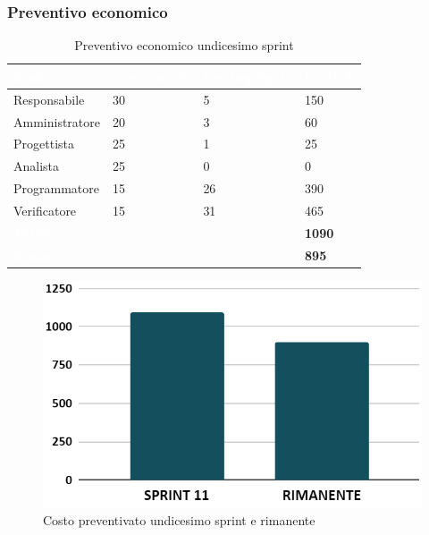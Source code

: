 \newpage

\subsubsection{Preventivo economico}

{
\setlength{\tabcolsep}{10pt}
\renewcommand{\arraystretch}{1.5}
\begin{table}[h]
    \centering
    \begin{tabularx}{\textwidth}{| l | l | l | X |}
        \hline
        \rowcolor{headerrow} \textbf{\textcolor{white}{Ruolo}} & \textbf{\textcolor{white}{Costo orario}} & \textbf{\textcolor{white}{Ore impiegate}} & \textbf{\textcolor{white}{Costo €}} \\
        \hline
        Responsabile & 30 & 5 & 150\\
        \hline
        Amministratore & 20 & 3 & 60\\
        \hline
        Progettista& 25 & 1 & 25\\
        \hline
        Analista & 25 & 0 & 0\\
        \hline
        Programmatore & 15 & 26 & 390\\
        \hline
        Verificatore & 15 & 31 & 465\\
        \hline
        \cellcolor{headerrow} \textbf{\textcolor{white}{Totale}} &  &  & \textbf{1090}\\
        \hline
        \cellcolor{headerrow} \textbf{\textcolor{white}{Rimanente}} &  &  & \textbf{895}\\
        \hline
    \end{tabularx}
    \caption{Preventivo economico undicesimo sprint}
    \label{tab:preventivocosti11sprint}
\end{table}
}

\begin{figure}[h!]
    \centering
    \includegraphics[width=\textwidth]{prev11costo.png}
    \caption{Costo preventivato undicesimo sprint e rimanente}
    \label{fig:preventivocosto11sprint}
\end{figure}

\newpage